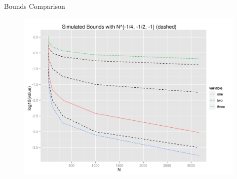 \documentclass{beamer}
\begin{document}
\begin{frame}{Bounds Comparison}
  \begin{figure}[!ht]
   \centering
   \includegraphics[scale=.5]{boundsexact.png}
 \end{figure}
\end{frame}
\end{document}
